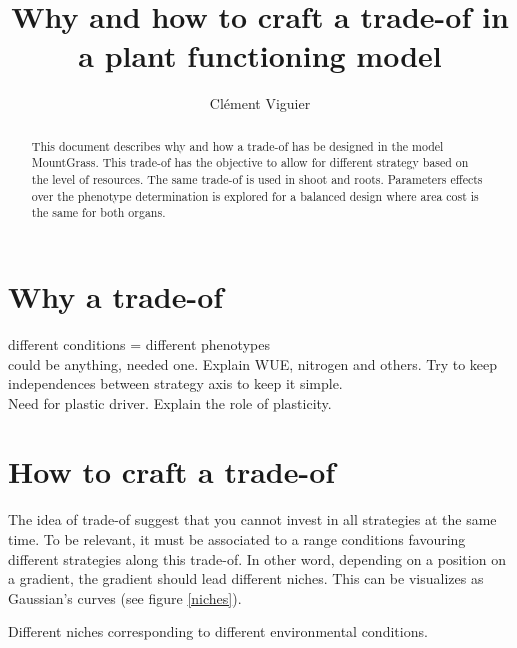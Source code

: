 \documentclass[a4paper, justified,marginals=raggedright]{tufte-handout}
\title{Why and how to craft a trade-of in a plant functioning model}
\author{Clément Viguier}
\begin{document}
\maketitle
\begin{fullwidth}
\begin{abstract}
\noindent
This document describes why and how a trade-of has be designed in the model MountGrass. This trade-of has the objective to allow for different strategy based on the level of resources. The same trade-of is used in shoot and roots. Parameters effects over the phenotype determination is explored for a balanced design where area cost is the same for both organs.
\end{abstract}
\end{fullwidth}

\section{Why a trade-of}
different conditions = different phenotypes\\
could be anything, needed one. Explain WUE, nitrogen and others. Try to keep independences between strategy axis to keep it simple.\\
Need for plastic driver. Explain the role of plasticity.

\section{How to craft a trade-of}

\indent The idea of trade-of suggest that you cannot invest in all strategies at the same time. To be relevant, it must be associated to a range conditions favouring different strategies along this trade-of. In other word, depending on a position on a gradient, the gradient should lead different niches. This can be visualizes as Gaussian's curves (see figure \ref{niches}).

\begin{marginfigure}[-30mm]
\label{niches}
\caption{Different niches corresponding to different environmental conditions.}
\end{marginfigure}
\end{document}

